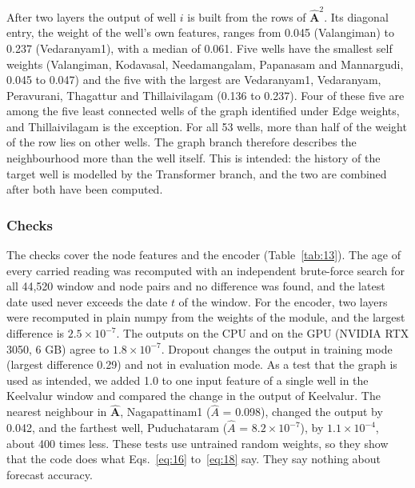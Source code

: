 \documentclass[conference]{IEEEtran}
\begin{document}
After two layers the output of well \(i\) is built from the rows of \(\hat{\mathbf{A}}^2\). Its diagonal entry, the weight of the well's own features, ranges from 0.045 (Valangiman) to 0.237 (Vedaranyam1), with a median of 0.061. Five wells have the smallest self weights (Valangiman, Kodavasal, Needamangalam, Papanasam and Mannargudi, 0.045 to 0.047) and the five with the largest are Vedaranyam1, Vedaranyam, Peravurani, Thagattur and Thillaivilagam (0.136 to 0.237). Four of these five are among the five least connected wells of the graph identified under Edge weights, and Thillaivilagam is the exception. For all 53 wells, more than half of the weight of the row lies on other wells. The graph branch therefore describes the neighbourhood more than the well itself. This is intended: the history of the target well is modelled by the Transformer branch, and the two are combined after both have been computed.

\subsubsection{Checks}

The checks cover the node features and the encoder (Table~\ref{tab:13}). The age of every carried reading was recomputed with an independent brute-force search for all 44,520 window and node pairs and no difference was found, and the latest date used never exceeds the date \(t\) of the window. For the encoder, two layers were recomputed in plain numpy from the weights of the module, and the largest difference is \(2.5 \times 10^{-7}\). The outputs on the CPU and on the GPU (NVIDIA RTX 3050, 6 GB) agree to \(1.8 \times 10^{-7}\). Dropout changes the output in training mode (largest difference 0.29) and not in evaluation mode. As a test that the graph is used as intended, we added 1.0 to one input feature of a single well in the Keelvalur window and compared the change in the output of Keelvalur. The nearest neighbour in \(\hat{\mathbf{A}}\), Nagapattinam1 (\(\hat{A}\) = 0.098), changed the output by 0.042, and the farthest well, Puduchataram (\(\hat{A}\) = \(8.2 \times 10^{-7}\)), by \(1.1 \times 10^{-4}\), about 400 times less. These tests use untrained random weights, so they show that the code does what Eqs.~\eqref{eq:16} to~\eqref{eq:18} say. They say nothing about forecast accuracy.
\end{document}

